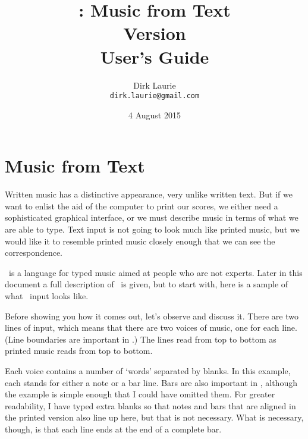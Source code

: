 \documentclass[11pt]{article}
\date{4 August 2015}
\title{\Huge \textbf{\MTx: Music from Text \\ \LARGE Version\current} \\
  User's Guide \vfill}
\author{\LARGE Dirk Laurie\\ \texttt{dirk.laurie@gmail.com} }
\begin{document}
\vfill
\maketitle
\vfill
\begin{center}  
  \framebox[5in]{\parbox{3.6in}{
    \begin{mus}  \bigskip \end{mus}
  }}        
\end{center}
\vfill\vfill\vfill
\thispagestyle{empty}

\pagebreak
{}
\tableofcontents
\pagebreak
{}
\section{Music from Text}
  Written music has a distinctive appearance, very unlike written text.
But if we want to enlist the aid of the computer to print our scores, we 
either need a sophisticated graphical interface, or we must describe 
music in terms of what we are able to type.   Text input is not going to 
look much like printed music, but we would like it to resemble printed 
music closely enough that we can see the correspondence. 

\MTx~is a language for typed music aimed at people who are not experts.
Later in this document a full description of \MTx~is given, but to start 
with, here is a sample of what \MTx~input looks like.

Before showing you how it comes out, let's observe and discuss it.
There are two lines of input, which means that there are two voices 
of music, one for each line.  (Line boundaries are important in \MTx.)
The lines read from top to bottom as printed music reads from top to 
bottom.

Each voice contains a number of `words' separated by blanks.   In this 
example, each  stands for either a note or a bar line.  Bars are 
also important in \MTx, although the example is simple enough that I 
could have omitted them.  For greater readability, I have typed extra 
blanks so that notes and bars that are aligned in the printed version 
also line up here, but that is not necessary.  What is necessary, 
though, is that each line ends at the end of a complete bar.
\end{document}

